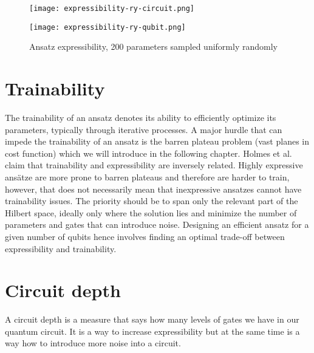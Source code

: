 \begin{figure}[H]
    \centering
    \begin{minipage}{0.4\linewidth}
        \centering
        \texttt{[image: expressibility-ry-circuit.png]}
    \end{minipage}
    \begin{minipage}{0.4\linewidth}
        \centering
        \texttt{[image: expressibility-ry-qubit.png]}
    \end{minipage}
    \caption{Ansatz expressibility, 200 parameters sampled uniformly randomly}
\end{figure}

\section{Trainability}
The trainability of an ansatz denotes its ability to efficiently optimize its parameters, typically through iterative processes. A major hurdle that can impede the trainability of an ansatz is the barren plateau problem (vast planes in cost function) which we will introduce in the following chapter. Holmes et al.~\cite{holmes2022} claim that trainability and expressibility are inversely related. Highly expressive ansätze are more prone to barren plateaus and therefore are harder to train, however, that does not necessarily mean that inexpressive ansatzes cannot have trainability issues. The priority should be to span only the relevant part of the Hilbert space, ideally only where the solution lies and minimize the number of parameters and gates that can introduce noise. Designing an efficient ansatz for a given number of qubits hence involves finding an optimal trade-off between expressibility and trainability.~\cite{holmes2022}


\section{Circuit depth}
A circuit depth is a measure that says how many levels of gates we have in our quantum circuit. It is a way to increase expressibility but at the same time is a way how to introduce more noise into a circuit. 

